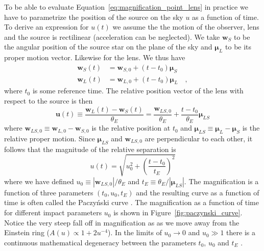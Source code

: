\documentclass[12pt,dvipsnames]{report}
\renewcommand{\vec}[1]{\boldsymbol{\mathbf{#1}}}
\begin{document}
To be able to evaluate Equation~\ref{eq:magnification_point_lens} in practice
we have to parametrize the position of the source on the sky $u$ as a function
of time. To derive an expression for $u(t)$ we assume the the motion of the
observer, lens and the source is rectilinear (acceleration can be neglected).
We take $\vec{w}_S$ to be the angular position of the source star on the plane
of the sky and $\boldsymbol{\mu}_L$ to be its proper motion vector. Likewise
for the lens. We thus have
\begin{align}
    \vec{w}_S(t) & =\vec{w}_{S, 0}+
    \left(t-t_{0}\right) \boldsymbol{\mu}_S
    \label{eq:source_position}      \\
    \vec{w}_L(t) & =\vec{w}_{L, 0}
    +\left(t-t_{0}\right) \boldsymbol{\mu}_L\quad,
    \label{eq:lens_position}
\end{align}
where $t_0$ is some reference time.
The relative position vector of the lens with respect to the source is then
\begin{equation}
    \boldsymbol{u}(t) \equiv \frac{\vec{w}_L(t)
        -\vec{w}_S(t)}{\theta_E}=
    \frac{\vec{w}_{LS, 0}}{\theta_E}
    +\frac{t-t_{0}}{\theta_E} \boldsymbol{\mu}_{LS}
    \label{eq:relative_trajectory_no_parallax}
\end{equation}
where
$\vec{w}_{L S, 0}\equiv\vec{w}_{L,0}-\vec{w}_{S, 0}$
is the relative position at $t_0$ and
$\boldsymbol{\mu}_{LS}\equiv \boldsymbol{\mu}_{L}- \boldsymbol{\mu}_{S}$ is the
relative proper motion.
Since $\boldsymbol{\mu}_{LS}$ and $\vec{w}_{L S, 0}$ are
perpendicular to each other, it follows that the magnitude of the relative
separation is
\begin{equation}
    u(t)=\sqrt{u_0^2+ \left(\frac{t-t_0}{t_E}\right)^2}
\end{equation}
where we have defined $u_0\equiv |\vec{w}_{L S, 0}|/\theta_E$
and $t_E\equiv \theta_E/|\boldsymbol{\mu}_{LS}|$.
The magnification is a function of three parameters $(t_0, u_0, t_E)$
and the resulting curve as a function of time is often called the Paczy\'nski curve
\citep{1986ApJ...304....1P,1986ApJ...301..503P}.
The magnification as a function of time for different impact parameters $u_0$
is shown in Figure~\ref{fig:paczynski_curve}. Notice the very steep fall off in
magnification as as we move away from the Einstein ring ($A(u)\propto
    1+2u^{-4}$).
In the limits of $u_0\rightarrow 0$ and $u_0\gg 1$  there is a continuous
mathematical degeneracy between the parameters $t_0$, $u_0$ and $t_E$
\citep{1997ApJ...487...55W}.
\end{document}
